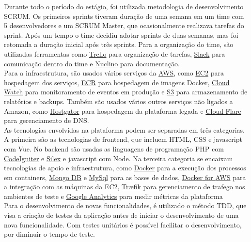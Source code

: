 Durante todo o período do estágio, foi utilizada metodologia de desenvolvimento \gls{SCRUM}. Os primeiros sprints tiveram duração de uma semana em um time com 5 desenvolvedores e um \gls{SCRUM} Master, que ocasionalmente realizava tarefas do sprint. Após um tempo o time decidiu adotar sprints de duas semanas, mas foi retomada a duração inicial após três sprints. Para a organização do time, são utilizadas ferramentas como \href{https://trello.com/}{Trello} para organização de tarefas, \href{https://slack.com/}{Slack} para comunicação dentro do time e \href{https://www.nuclino.com/}{Nuclino} para documentação.\\

Para a infraestrutura, são usados vários serviços da \href{https://aws.amazon.com/}{\gls{AWS}}, como \href{https://aws.amazon.com/ec2/}{\gls{EC2}} para hospedagem dos serviços, \href{https://aws.amazon.com/ecr/}{\gls{ECR}} para hospedagem de imagens \gls{Docker}, \href{https://aws.amazon.com/cloudwatch/}{Cloud Watch} para monitoramento de eventos em produção e \href{https://aws.amazon.com/s3/}{\gls{S3}} para armazenamento de relatórios e backups. Também são usados vários outros serviços não ligados a Amazon, como \href{https://www.hostgator.com.br/}{Hostgator} para hospedagem da plataforma legada e \href{https://www.cloudflare.com/br/}{Cloud Flare} para gerenciamento de \gls{DNS}.\\

As tecnologias envolvidas na plataforma podem ser separadas em três categorias. A primeira são as tecnologias de \gls{frontend}, que incluem \gls{HTML}, \gls{CSS} e \gls{javascript} com \gls{Vue}. No \gls{backend} são usadas as linguagens de programação \gls{PHP} com \href{https://codeigniter.com/}{CodeIgniter} e \href{https://silex.symfony.com/}{Silex} e \gls{javascript} com \gls{Node}. Na terceira categoria se encaixam tecnologias de apoio e infraestrutura, como \href{https://www.docker.com/}{\gls{Docker}} para a execução dos processos em \glspl{container}, \href{https://www.mongodb.com/}{Mongo DB} e \href{https://www.mysql.com/}{MySql} para as bases de dados, \href{https://docs.docker.com/docker-for-aws/}{\gls{Docker} for \gls{AWS}} para a integração com as máquinas da \gls{EC2}, \href{https://traefik.io/}{Træfik} para gerenciamento de trafego nos ambientes de teste e \href{https://analytics.google.com/analytics/}{Google Analytics} para medir métricas da plataforma\\

Para o desenvolvimento de novas funcionalidades, é utilizado o método \gls{TDD}, que visa a criação de testes da aplicação antes de iniciar o desenvolvimento de uma nova funcionalidade. Com testes unitários é possível facilitar o desenvolvimento, por diminuir o tempo de teste.

